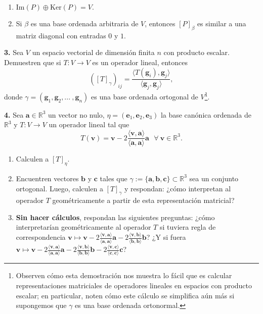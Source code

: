 \documentclass[a4paper]{article}
\begin{document}
\begin{enumerate}[label=\alph*)]
    \item $\text{Im}(P)\oplus \text{Ker}(P)=V.$  
    \item Si $\beta$ es una base ordenada arbitraria de $V$, entonces $[P]_\beta$ es similar a una matriz diagonal con entradas $0$ y $1$.
\end{enumerate}

\vspace{3mm}
\textbf{3.} Sea $V$ un espacio vectorial de dimensión finita $n$ con producto escalar. Demuestren que si $T:V\to V$ es un operador lineal, entonces \[
    ([T]_\gamma )_{ij}=\frac{\langle T(\mathbf{g}_i) , \mathbf{g}_j \rangle}{\langle \mathbf{g}_j , \mathbf{g}_j \rangle},
\] donde $\gamma=(\mathbf{g}_1,\mathbf{g}_2,... \ ,\mathbf{g}_n)$ es una base ordenada ortogonal de $V$\footnote{Observen cómo esta demostración nos muestra lo fácil que es calcular representaciones matriciales de operadores lineales en espacios con producto escalar; en particular, noten cómo este cálculo se simplifica aún más si supongemos que $\gamma$ es una base ordenada ortonormal.}.

\vspace{3mm}
\textbf{4.} Sea $\mathbf{a}\in\mathbb{R}^3$ un vector no nulo, $\eta=(\mathbf{e}_1,\mathbf{e}_2,\mathbf{e}_3)$ la base canónica ordenada de $\mathbb{R}^3$ y $T:V\to V$ un operador lineal tal que \[
    T(\mathbf{v})=\mathbf{v}-2\frac{\langle \mathbf{v} ,\mathbf{a} \rangle}{\langle \mathbf{a} ,\mathbf{a} \rangle}\mathbf{a} \ \ \ \forall \ \mathbf{v}\in\mathbb{R}^3.
\] 
\begin{enumerate}[label=\alph*)]
    \item Calculen a $[T]_\eta$.
\item Encuentren vectores $\mathbf{b}$ y $\mathbf{c}$ tales que $\gamma:=\{\mathbf{a}, \mathbf{b}, \mathbf{c}\}\subset \mathbb{R}^3$ sea un conjunto ortogonal. Luego, calculen a $[T]_\gamma$ y respondan: ¿cómo interpretan al operador $T$ geométricamente a partir de esta representación matricial?
\item \textbf{Sin hacer cálculos}, respondan las siguientes preguntas: ¿cómo interpretarían geométricamente al operador $T$ si tuviera regla de correspondencia $\mathbf{v}\mapsto \mathbf{v}-2\frac{\langle \mathbf{v} , \mathbf{a} \rangle}{\langle \mathbf{a} , \mathbf{a} \rangle}\mathbf{a} - 2\frac{\langle \mathbf{v} , \mathbf{b} \rangle}{\langle \mathbf{b} , \mathbf{b} \rangle}\mathbf{b}$? ¿Y si fuera $\mathbf{v}\mapsto \mathbf{v}-2\frac{\langle \mathbf{v} , \mathbf{a} \rangle}{\langle \mathbf{a} , \mathbf{a} \rangle}\mathbf{a} - 2\frac{\langle \mathbf{v} , \mathbf{b} \rangle}{\langle \mathbf{b} , \mathbf{b} \rangle}\mathbf{b}-2\frac{\langle \mathbf{v} , \mathbf{c} \rangle}{\langle \mathbf{c} , \mathbf{c} \rangle}\mathbf{c}$?
\end{enumerate}
\end{document}
